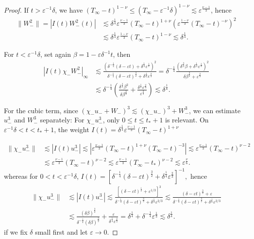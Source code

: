 \documentclass[letterpaper,11pt]{article}
\newcommand{\eps}{\varepsilon}
\newcommand{\lar}{ \lesssim }
\numberwithin{equation}{section}
\theoremstyle{plain}
\begin{document}
\begin{itemize}
\begin{enumerate}
\begin{proof}
If $t > \eps^{-1}\delta$, we have $(T_\infty -t )^{1-\nu} \le (T_\infty - \eps^{-1}\delta)^{1-\nu} \lar \eps^{\frac{\nu-1}{3}}$, hence 
\begin{align*}
\|W_-^2\| = |I(t) W_-^2(t) | &\lar \delta^{\frac{1}{4}} \eps^{\frac{\nu-1}{3}}(T_\infty - t)^{1+\nu}\left( \eps^{\frac{1-\nu}{3}}(T_\infty - t)^{-\nu}\right)^2\\ & \lar \delta^{\frac{1}{4}} \eps^{\frac{1-\nu}{3}}(T_\infty-t)^{1-\nu} \lar \delta^{\frac{1}{4}}.
\end{align*} 

For $t < \eps^{-1}\delta$, set again $\beta = 1-\eps \delta^{-1}t$, then
\begin{align*}
|I(t)\chi_-  W_-^2|_\infty &\lar \frac{ \left( \delta^{-\frac{1}{4}}(\delta-\eps t)+\delta^{\frac{1}{4}}\eps^{\frac{1}{3}} \right)^2}{\delta^{-\frac{1}{4}}(\delta-\eps t)^{\frac{3}{2}}+\delta^{\frac{1}{4}}\eps^{\frac{2}{3}} } = \delta^{-\frac{1}{4}}\frac{\left( \delta^{\frac{3}{4}}\beta+\delta^{\frac{1}{4}}\eps^{\frac{1}{3}} \right)^2 }{\delta\beta^{\frac{3}{2}}+\eps^{\frac{2}{3}}} \\
& \lar \delta^{-\frac{1}{4}} \left(\frac{\delta^{\frac{3}{2}}\beta^2}{\delta\beta^{\frac{3}{2}}} + \frac{\delta^{\frac{1}{2}}\eps^{\frac{2}{3}}}{\eps^{\frac{2}{3}}} \right) \lar \delta^{\frac{1}{4}}.
\end{align*}



For the cubic term, since $(\chi_-u_-+W_-)^3 \lar (\chi_-u_-)^3+W_-^3$, we can estimate $u_-^3$ and $W_-^3$ separately:
For $\chi_-u_-^3$, only $0 \le t \le t_*+1$ is relevant. On $\eps^{-1}\delta<t<t_*+1$, the weight $I(t) = \delta^{\frac{1}{4}}\eps^{\frac{\nu-1}{3}}(T_\infty-t)^{1+\nu}$


\begin{align*}
\|\chi_-u_-^3\| &\lar | I(t)u_-^3| \lar |\eps^{\frac{\nu-1}{3}}(T_\infty-t)^{1+\nu}(T_\infty-t)^{-3} | \lar \eps^{\frac{\nu-1}{3}} (T_\infty-t)^{\nu-2} \\
& \lar \eps^{\frac{\nu-1}{3}}  (T_\infty - t)^{\nu-2} \lar \eps^{\frac{\nu-1}{3}} (T_\infty-t_*)^{\nu-2} \lar \eps^{\frac{\nu}{6}}.
\end{align*}
whereas for $0<t<\eps^{-1}\delta$, $I(t) =  [\delta^{-\frac{1}{4}} (\delta -\eps t)^{\frac{3}{2}}+\delta^{\frac{1}{4}}\eps^{\frac{2}{3}}]^{-1},$ hence
\begin{align*}
\| \chi_-u_-^3\| &\lar |I(t)u_-^3| \lar \frac{[(\delta-\eps t)^{\frac{1}{2}}+\eps^{1/3} ]^{3}}{ \delta^{-\frac{1}{4}}(\delta-\eps t)^{\frac{3}{2}} + \delta^{\frac{1}{4}}\eps^{2/3}} \lar \frac{ (\delta-\eps t)^{\frac{3}{2}}+ \eps}{\delta^{-\frac{1}{4}}(\delta-\eps t)^{\frac{3}{2}} + \delta^{\frac{1}{4}}\eps^{2/3}}\\
&\lar \frac{(\delta\beta)^{\frac{3}{2}}}{\delta^{-\frac{1}{4}}(\delta\beta)^{\frac{3}{2}} } + \frac{\eps}{\delta^{\frac{1}{4}} \eps^{\frac{2}{3}}}  = \delta^{\frac{1}{4}} + \delta^{-\frac{1}{4}}\eps^{\frac{1}{3}} \lar \delta^{\frac{1}{4}}.
\end{align*}
if we fix $\delta$ small first and let $\eps \to 0$.


\end{proof}
\end{enumerate}
\end{itemize}
\end{document}
